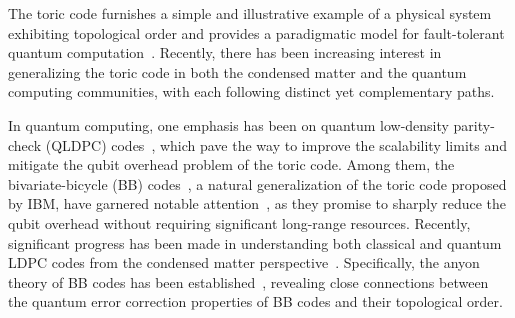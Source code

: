 \documentclass[aps,prb,english,superscriptaddress,twocolumn,tightenlines,showpacs,longbibliography,floatfix,amsfonts]{revtex4-2}
\begin{document}
The toric code furnishes a simple and illustrative example of a physical system exhibiting topological order and provides a paradigmatic model for fault-tolerant quantum computation~\cite{Kitaev2003}. Recently, there has been increasing interest in generalizing the toric code in both the condensed matter and the quantum computing communities, with each following distinct yet complementary paths.
  
In quantum computing, one emphasis has been on quantum low-density parity-check (QLDPC) codes~\cite{Postol2001, MacKay2004, Kovalev2013, Bravyi2014, Tillich2014, Gottesman2014, Babar2015, Hastings2021, Breuckmann2021, Panteleev2021, Panteleev2022-1,  Panteleev2022-2, Breuckmann2021-2, Tremblay2022, Raveendran2022, Xu2024}, which pave the way to improve the scalability limits and mitigate the qubit overhead problem of the toric code. Among them, the bivariate-bicycle (BB) codes~\cite{Bravyi2024}, a natural generalization of the toric code proposed by IBM, have garnered notable attention~\cite{Bravyi2022, Shaw2025, Eberhardt2024, Eberhardt2025, Berthusen2025, Cowtan2024, Gong2024, Poole2024, Williamson2024, Wang2024, Liang2024-2, Blue2025, Sayginel2025, Yoder2025, Postema2025, Voss2025}, as they promise to sharply reduce the qubit overhead without requiring significant long-range resources. Recently, significant progress has been made in understanding both classical and quantum LDPC codes from the condensed matter perspective~\cite{Lim2021, Rakovszky2023, Rakovszky2024, Deroeck2024, Liang2024-1, Yin2025, Placke2024}. Specifically, the anyon theory of BB codes has been established~\cite{Chen2025, Liang2025}, revealing close connections between the quantum error correction properties of BB codes and their topological order.
  
\end{document}
